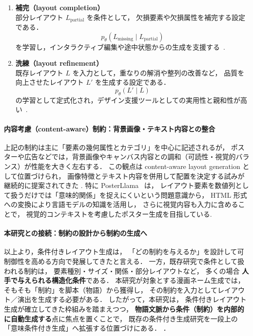 \documentclass[a4j,12pt,dvipdfmx]{jsreport}
\begin{document}
\begin{enumerate}
   \item \textbf{補完（layout completion）}\\
         部分レイアウト $L_{\text{partial}}$ を条件として，
         欠損要素や欠損属性を補完する設定である．
         \begin{equation}
            p_\theta(L_{\text{missing}} \mid L_{\text{partial}})
         \end{equation}
         を学習し，インタラクティブ編集や途中状態からの生成を支援する~\cite{li_layoutgan_2019}.

   \item \textbf{洗練（layout refinement）}\\
         既存レイアウト $L$ を入力として，重なりの解消や整列の改善など，
         品質を向上させたレイアウト $L'$ を生成する設定である．
         \begin{equation}
            p_\theta(L' \mid L)
         \end{equation}
         の学習として定式化され，デザイン支援ツールとしての実用性と親和性が高い~\cite{rahman2021ruite}.
\end{enumerate}

\vspace{0.5em}
\paragraph{内容考慮（content-aware）制約：背景画像・テキスト内容との整合}
上記の制約は主に「要素の幾何属性とカテゴリ」を中心に記述されるが，
ポスターや広告などでは，背景画像やキャンバス内容との調和（可読性・視覚的バランス）が性能を大きく左右する．
この観点は content-aware layout generation として位置づけられ，
画像特徴とテキスト内容を併用して配置を決定する試みが継続的に提案されてきた
\cite{yang2019contentgan,seol_posterllama_2024,horita_retrieval-augmented_2023}.
特に PosterLlama~\cite{seol_posterllama_2024} は，
レイアウト要素を数値列として扱うだけでは「意味的関係」を捉えにくいという問題意識から，
HTML 形式への変換により言語モデルの知識を活用し，
さらに視覚内容も入力に含めることで，
視覚的コンテキストを考慮したポスター生成を目指している.

\vspace{0.5em}
\paragraph{本研究との接続：制約の設計から制約の生成へ}
以上より，条件付きレイアウト生成は，
「どの制約を与えるか」を設計して可制御性を高める方向で発展してきたと言える．
一方，既存研究で条件として扱われる制約は，
要素種別・サイズ・関係・部分レイアウトなど，
多くの場合 \textbf{人手で与えられる構造化条件}である．
本研究が対象とする漫画ネーム生成では，
そもそも「制約」を脚本（物語）から獲得し，
その制約を入力としてレイアウト／演出を生成する必要がある．
したがって，本研究は，
条件付きレイアウト生成が確立してきた枠組みを踏まえつつ，
\textbf{物語文脈から条件（制約）を内部的に自動生成する}点に焦点を置くことで，
既存の条件付き生成研究を一段上の「意味条件付き生成」へ拡張する位置づけにある．
．
\end{document}
